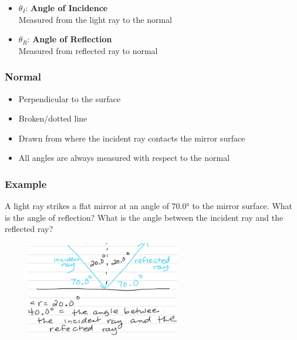 \documentclass[a4paper,12pt]{article}
\begin{document}
\begin{itemize}
    \item{$\theta_I$: \textbf{Angle of Incidence} \\Measured from the light ray to the normal}
    \item{$\theta_R$: \textbf{Angle of Reflection} \\Measured from reflected ray to normal}
\end{itemize}

\subsubsection{Normal}
\begin{itemize}
    \item{Perpendicular to the surface}
    \item{Broken/dotted line}
    \item{Drawn from where the incident ray contacts the mirror surface}
    \item{All angles are always measured with respect to the normal}
\end{itemize}

\subsubsection{Example}
A light ray strikes a flat mirror at an angle of \ang{70.0} to the mirror surface. What is the angle of reflection? What is the angle between the incident ray and the reflected ray?
\begin{figure}[H]
    \centering
    \includegraphics[width=0.6\textwidth]{ex-reflect}
\end{figure}
\end{document}
